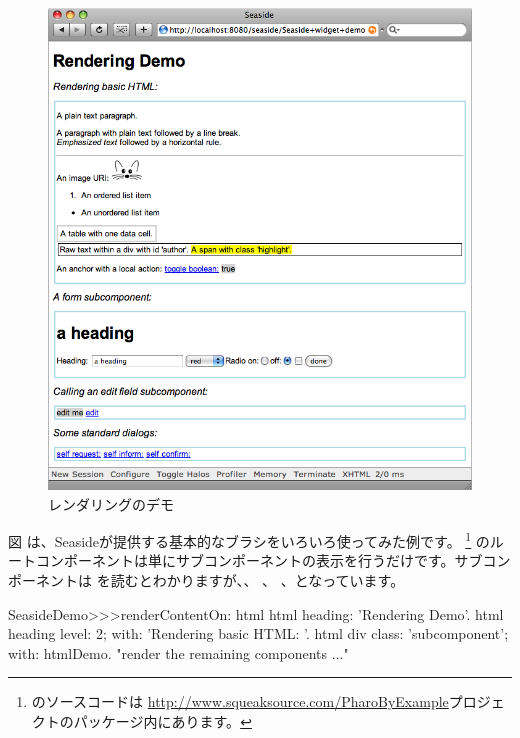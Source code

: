 \documentclass[a4paper,10pt,twoside]{book}
\begin{document}
\begin{figure}[ht]
\begin{center}
\includegraphics[width=\textwidth]{RenderingDemo}
\caption{レンダリングのデモ}
\end{center}
\end{figure}

図 は、Seasideが提供する基本的なブラシをいろいろ使ってみた例です。 \footnote{
 のソースコードは  \url{http://www.squeaksource.com/PharoByExample}プロジェクトのパッケージ内にあります。}  のルートコンポーネントは単にサブコンポーネントの表示を行うだけです。サブコンポーネントは を読むとわかりますが、、 、 、となっています。
 
\needspace{7ex}
\begin{method}[renderdemo]{}
SeasideDemo>>>renderContentOn: html
	html heading: 'Rendering Demo'.
	html heading
		level: 2;
		with: 'Rendering basic HTML: '.
	html div
		class: 'subcomponent';
		with: htmlDemo.
	"render the remaining components ..."
\end{method}
\end{document}
